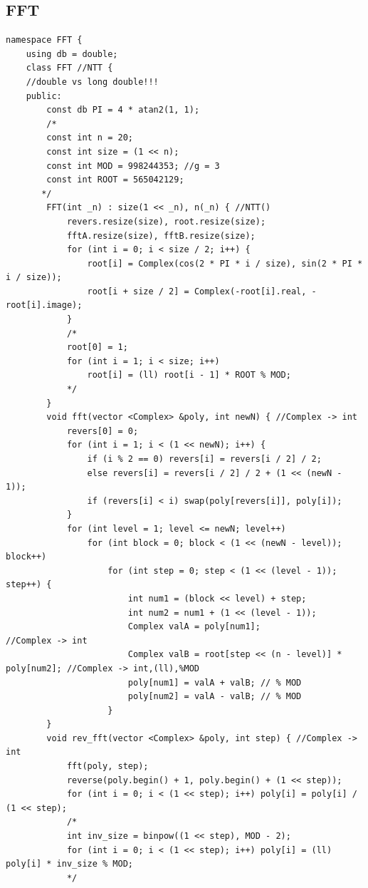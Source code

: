 \documentclass[10pt, portrait,letterpaper]{article}
\begin{document}
\subsection{FFT}

\begin{verbatim}
namespace FFT {
    using db = double;
    class FFT //NTT {
    //double vs long double!!!
    public:
        const db PI = 4 * atan2(1, 1);
        /*
        const int n = 20;
        const int size = (1 << n);
        const int MOD = 998244353; //g = 3
        const int ROOT = 565042129;
       */
        FFT(int _n) : size(1 << _n), n(_n) { //NTT()
            revers.resize(size), root.resize(size);
            fftA.resize(size), fftB.resize(size);
            for (int i = 0; i < size / 2; i++) {
                root[i] = Complex(cos(2 * PI * i / size), sin(2 * PI * i / size));
                root[i + size / 2] = Complex(-root[i].real, -root[i].image);
            }
            /*
            root[0] = 1;
            for (int i = 1; i < size; i++)
                root[i] = (ll) root[i - 1] * ROOT % MOD;
            */
        }
        void fft(vector <Complex> &poly, int newN) { //Complex -> int
            revers[0] = 0;
            for (int i = 1; i < (1 << newN); i++) {
                if (i % 2 == 0) revers[i] = revers[i / 2] / 2;
                else revers[i] = revers[i / 2] / 2 + (1 << (newN - 1));
                if (revers[i] < i) swap(poly[revers[i]], poly[i]);
            }
            for (int level = 1; level <= newN; level++)
                for (int block = 0; block < (1 << (newN - level)); block++)
                    for (int step = 0; step < (1 << (level - 1)); step++) {
                        int num1 = (block << level) + step;
                        int num2 = num1 + (1 << (level - 1));
                        Complex valA = poly[num1];                             //Complex -> int
                        Complex valB = root[step << (n - level)] * poly[num2]; //Complex -> int,(ll),%MOD
                        poly[num1] = valA + valB; // % MOD
                        poly[num2] = valA - valB; // % MOD
                    }
        }
        void rev_fft(vector <Complex> &poly, int step) { //Complex -> int
            fft(poly, step);
            reverse(poly.begin() + 1, poly.begin() + (1 << step));
            for (int i = 0; i < (1 << step); i++) poly[i] = poly[i] / (1 << step);
            /*
            int inv_size = binpow((1 << step), MOD - 2);
            for (int i = 0; i < (1 << step); i++) poly[i] = (ll) poly[i] * inv_size % MOD;
            */

\end{verbatim}
\end{document}
